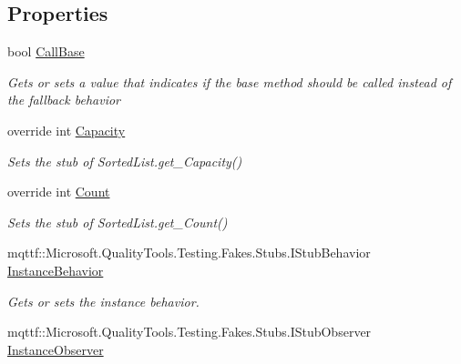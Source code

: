 \subsection*{Properties}
\begin{DoxyCompactItemize}
\item 
bool \hyperlink{class_system_1_1_collections_1_1_fakes_1_1_stub_sorted_list_a6f78fc93c16d70412b4515760c6495db}{Call\-Base}
\begin{DoxyCompactList}\small\item\em Gets or sets a value that indicates if the base method should be called instead of the fallback behavior\end{DoxyCompactList}\item 
override int \hyperlink{class_system_1_1_collections_1_1_fakes_1_1_stub_sorted_list_ac772f600962424fd819fcd7f7a382165}{Capacity}
\begin{DoxyCompactList}\small\item\em Sets the stub of Sorted\-List.\-get\-\_\-\-Capacity()\end{DoxyCompactList}\item 
override int \hyperlink{class_system_1_1_collections_1_1_fakes_1_1_stub_sorted_list_afb2784d5f409ea1932cdfd526a6d04a4}{Count}
\begin{DoxyCompactList}\small\item\em Sets the stub of Sorted\-List.\-get\-\_\-\-Count()\end{DoxyCompactList}\item 
mqttf\-::\-Microsoft.\-Quality\-Tools.\-Testing.\-Fakes.\-Stubs.\-I\-Stub\-Behavior \hyperlink{class_system_1_1_collections_1_1_fakes_1_1_stub_sorted_list_a5c145c7675d3203450ba05f9276fd6b3}{Instance\-Behavior}
\begin{DoxyCompactList}\small\item\em Gets or sets the instance behavior.\end{DoxyCompactList}\item 
mqttf\-::\-Microsoft.\-Quality\-Tools.\-Testing.\-Fakes.\-Stubs.\-I\-Stub\-Observer \hyperlink{class_system_1_1_collections_1_1_fakes_1_1_stub_sorted_list_a949bae85d5948e4646e5edbbbec21067}{Instance\-Observer}

\end{DoxyCompactItemize}
